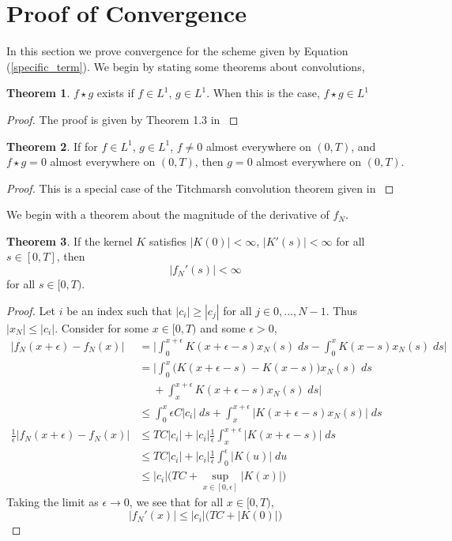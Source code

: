 \documentclass[11pt]{article}
\numberwithin{equation}{section}
\theoremstyle{definition}
\newtheorem{theorem}{Theorem}[section]
\newcommand{\eqr}[1]{Equation (\ref{#1})}
\begin{document}
\section{Proof of Convergence}
In this section we prove convergence for the scheme given by \eqr{specific_term}.
We begin by stating some theorems about convolutions,
\begin{theorem}
  \label{convolution_exists}
  $f \star g$ exists if $f \in L^1$, $g \in L^1$. When this is the case, $f \star g \in L^1$
\end{theorem}
\begin{proof}
The proof is given by Theorem 1.3 in \cite{stein71}
\end{proof}

\begin{theorem}
  \label{titchmarsh}
  If for $f \in L^1$, $g \in L^1$, $f \neq 0$ almost everywhere on $(0, T)$, and $f \star g = 0$ almost everywhere on $(0, T)$, then $g = 0$ almost everywhere on $(0, T)$.
\end{theorem}
\begin{proof}
This is a special case of the Titchmarsh convolution theorem given in \cite{titchmarsh}
\end{proof}

We begin with a theorem about the magnitude of the derivative of $f_N$.

\begin{theorem}
  \label{f_nderiv}
  If the kernel $K$ satisfies $|K(0)| < \infty$, $|K'(s)| < \infty$ for all $s \in [0, T]$,
  then 
$$
  |f_N'(s)|
  <
  \infty
$$
  for all $s \in [0, T)$.
\end{theorem}
\begin{proof}
Let $i$ be an index such that $|c_i| \geq |c_j|$ for all $j \in 0, ..., N-1$. Thus $|x_N| \leq |c_i|$.
Consider for some $x \in [0, T)$ and some $\epsilon > 0$,
\begin{align}
  \nonumber
  |f_N(x+\epsilon) - f_N(x)|
  &=
  \bigg|
  \int_0^{x+\epsilon} K(x+\epsilon - s)x_N(s)
  \; ds
  - \int_0^x K(x - s)x_N(s) 
  \; ds
  \bigg|
  \\
%
%
  \nonumber
  &=
  \bigg|
  \int_0^x \big(
    K(x+\epsilon - s) - K(x - s)
  \big)
  x_N(s)
  \; ds
  \\
  \nonumber
  &\quad
  \;
  + \int_x^{x+\epsilon} K(x+\epsilon-s)x_N(s)
  \; ds
  \bigg|
  \\
%
%
  \nonumber
  &\leq
  \int_0^x \epsilon C |c_i|
  \; ds
  + \int_{x}^{x+\epsilon} |K(x+\epsilon-s)x_N(s)|
  \; ds
  \\
%
%
  \nonumber
  \frac{1}{\epsilon}
  |f_N(x+\epsilon) - f_N(x)|
  &\leq
  TC|c_i| + 
  |c_i|
  \frac{1}{\epsilon}
  \int_x^{x+\epsilon} |K(x+\epsilon - s)|
  \; ds
  \\
%
%
  \nonumber
  &\leq
  TC|c_i|
  +
  |c_i|
  \frac{1}{\epsilon}
  \int_0^\epsilon |K(u)|
  \; du
  \\
%
%
  \nonumber
  &\leq
  |c_i|\Big(
    TC
    + \sup_{x\in[0, \epsilon]} |K(x)|
  \Big)
\end{align}
Taking the limit as $\epsilon \rightarrow 0$, we see that for all $x \in [0, T)$,
$$
  |f_N'(x)|
  \leq
  |c_i|\Big(
    TC
    + |K(0)|
  \Big)
$$
\end{proof}
\end{document}
